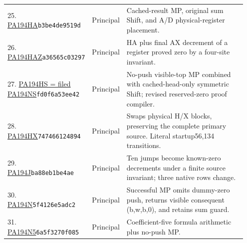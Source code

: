 \begin{longtable}{@{}p{0.27\linewidth}p{0.13\linewidth}p{0.55\linewidth}@{}}
25. \href{https://github.com/VladimirReshetnikov/ProveIt/blob/32d0d8b7d93a63ad4106c18cdb29b37927acdad2/Computability/BusyBeaver/Research/PA/docs/pa194haz_research_2026-11-14/machine/pa194ha.tm}{PA194HA}\newline\texttt{b3be4de9519d} & Principal & Cached-result MP, original sum Shift, and A/D physical-register placement.\\[5pt]
26. \href{https://github.com/VladimirReshetnikov/ProveIt/blob/32d0d8b7d93a63ad4106c18cdb29b37927acdad2/Computability/BusyBeaver/Research/PA/docs/pa194haz_research_2026-11-14/machine/pa194haz.tm}{PA194HAZ}\newline\texttt{a36565c03297} & Principal & HA plus final AX decrement of a register proved zero by a four-site invariant.\\[5pt]
27. \href{https://github.com/VladimirReshetnikov/ProveIt/blob/32d0d8b7d93a63ad4106c18cdb29b37927acdad2/Computability/BusyBeaver/Research/PA/docs/pa194ns_conpa_2026-11-13/machine/machine.tm}{PA194HS = filed PA194NS}\newline\texttt{fd0f6a53ee42} & Principal & No-push visible-top MP combined with cached-head-only symmetric Shift; revised reserved-zero proof compiler.\\[5pt]
28. \href{https://github.com/VladimirReshetnikov/ProveIt/blob/32d0d8b7d93a63ad4106c18cdb29b37927acdad2/docs/incoming/pa194_research_2026-11-14.zip}{PA194HX}\newline\texttt{747466124894} & Principal & Swaps physical H/X blocks, preserving the complete primary source. Literal startup56,134 transitions.\\[5pt]
29. \href{https://github.com/VladimirReshetnikov/ProveIt/blob/32d0d8b7d93a63ad4106c18cdb29b37927acdad2/Computability/BusyBeaver/Research/PA/docs/pa194j_pa194d_conpa_2026-11-13/construction/machine/pa194j.tm}{PA194J}\newline\texttt{ba88eb1be4ae} & Principal & Ten jumps become known-zero decrements under a finite source invariant; three native rows change.\\[5pt]
30. \href{https://github.com/VladimirReshetnikov/ProveIt/blob/32d0d8b7d93a63ad4106c18cdb29b37927acdad2/Computability/BusyBeaver/Research/PA/docs/pa194N_conpa_2026-11-13/construction/machine/pa194N.tm}{PA194N}\newline\texttt{5f4126e5adc2} & Principal & Successful MP omits dummy-zero push, returns visible consequent (b,w,b,0), and retains sum guard.\\[5pt]
31. \href{https://github.com/VladimirReshetnikov/ProveIt/blob/32d0d8b7d93a63ad4106c18cdb29b37927acdad2/Computability/BusyBeaver/Research/PA/docs/pa194n5_n6_conpa_2026-11-13/machines/pa194n5.tm}{PA194N5}\newline\texttt{6a5f3270f085} & Principal & Coefficient-five formula arithmetic plus no-push MP.\\[5pt]

\end{longtable}
